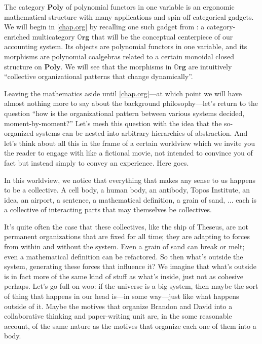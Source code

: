 \documentclass{eptcs}
\theoremstyle{definition}
\theoremstyle{plain}
\newcommand{\Cat}[1]{\textbf{#1}}%
\newcommand{\poly}{\Cat{Poly}}
\newcommand{\0}{\textsf{0}}
\newcommand{\1}{\tn{\textsf{1}}}
\newcommand{\org}{{\mathbb{O}\Cat{rg}}}
\begin{document}
The category $\poly$ of polynomial functors in one variable is an ergonomic mathematical structure with many applications and spin-off categorical gadgets. We will begin in \cref{chap.org} by recalling one such gadget from \cite{spivak2021learners}: a category-enriched multicategory $\org$ that will be the conceptual centerpiece of our accounting system. Its objects are polynomial functors in one variable, and its morphisms are polynomial coalgebras related to a certain monoidal closed structure on $\poly$. We will see that the morphisms in $\org$ are intuitively ``collective organizational patterns that change dynamically''.

Leaving the mathematics aside until \cref{chap.org}---at which point we will have almost nothing more to say about the background philosophy---let's return to the question ``how is the organizational pattern between various systems decided, moment-by-moment?'' Let's mesh this question with the idea that the so-organized systems can be nested into arbitrary hierarchies of abstraction. And let's think about all this in the frame of a certain worldview which we invite you the reader to engage with like a fictional movie, not intended to convince you of fact but instead simply to convey an experience. Here goes.

In this worldview, we notice that everything that makes any sense to us happens to be a collective. A cell body, a human body, an antibody, Topos Institute, an idea, an airport, a sentence, a mathematical definition, a grain of sand, ... each is a collective of interacting parts that may themselves be collectives. %

It's quite often the case that these collectives, like the ship of Theseus, are not permanent organizations that are fixed for all time; they are adapting to forces from within and without the system. Even a grain of sand can break or melt; even a mathematical definition can be refactored. So then what's outside the system, generating these forces that influence it? We imagine that what's outside is in fact more of the same kind of stuff as what's inside, just not as cohesive perhaps. Let's go full-on woo: if the universe is a big system, then maybe the sort of thing that happens in our head is---in some way---just like what happens outside of it. Maybe the motives that organize Brandon and David into a collaborative thinking and paper-writing unit are, in the some reasonable account, of the same nature as the motives that organize each one of them into a body. 
\end{document}
